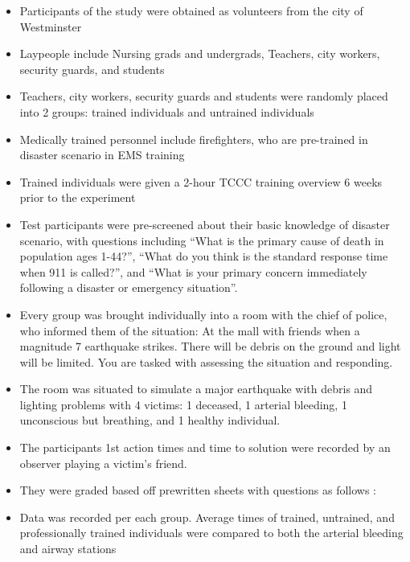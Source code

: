 \documentclass[]{article}
\begin{document}
\begin{itemize}
\itemsep1pt\parskip0pt
\item
  Participants of the study were obtained as volunteers from the city of
  Westminster
\item
  Laypeople include Nursing grads and undergrads, Teachers, city
  workers, security guards, and students
\item
  Teachers, city workers, security guards and students were randomly
  placed into 2 groups: trained individuals and untrained individuals
\item
  Medically trained personnel include firefighters, who are pre-trained
  in disaster scenario in EMS training
\item
  Trained individuals were given a 2-hour TCCC training overview 6 weeks
  prior to the experiment
\item
  Test participants were pre-screened about their basic knowledge of
  disaster scenario, with questions including ``What is the primary
  cause of death in population ages 1-44?'', ``What do you think is the
  standard response time when 911 is called?'', and ``What is your
  primary concern immediately following a disaster or emergency
  situation''.
\item
  Every group was brought individually into a room with the chief of
  police, who informed them of the situation: At the mall with friends
  when a magnitude 7 earthquake strikes. There will be debris on the
  ground and light will be limited. You are tasked with assessing the
  situation and responding.
\item
  The room was situated to simulate a major earthquake with debris and
  lighting problems with 4 victims: 1 deceased, 1 arterial bleeding, 1
  unconscious but breathing, and 1 healthy individual.
\item
  The participants 1st action times and time to solution were recorded
  by an observer playing a victim's friend.
\item
  They were graded based off prewritten sheets with questions as follows
  :
\item
  Data was recorded per each group. Average times of trained, untrained,
  and professionally trained individuals were compared to both the
  arterial bleeding and airway stations
\end{itemize}
\end{document}
